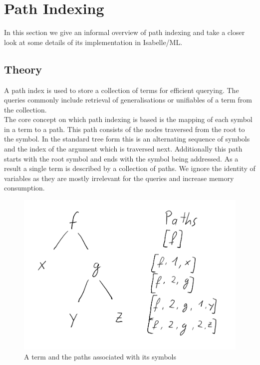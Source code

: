 \chapter{Path Indexing}
In this section we give an informal overview of path indexing and take a closer look at some details of its implementation in Isabelle/ML.\\
\section{Theory}
A path index is used to store a collection of terms for efficient querying. The queries commonly include retrieval of generalisations or unifiables of a term from the collection.\\
The core concept on which path indexing is based is the mapping of each symbol in a term to a path. This path consists of the nodes traversed from the root to the symbol. In the standard tree form this is an alternating sequence of symbols and the index of the argument which is traversed next. Additionally this path starts with the root symbol and ends with the symbol being addressed. As a result a single term is described by a collection of paths. We ignore the identity of variables as they are mostly irrelevant for the queries and increase memory consumption.\\
\begin{figure}[h]
\centering
\includegraphics[scale=0.25]{figures/term_path.png}
\caption{A term and the paths associated with its symbols}
\end{figure}\\
